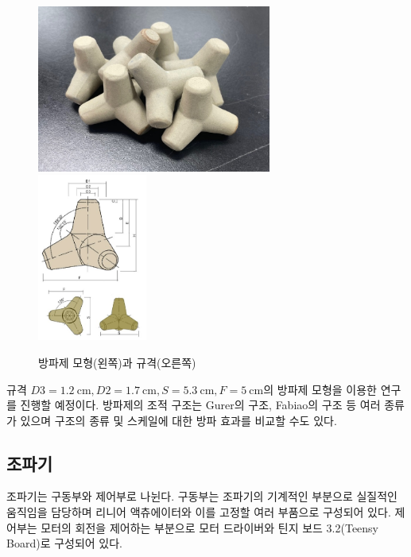 \begin{figure}[htbp]
    \centering
    \includegraphics[height=5.5cm]{images/Breakwater.jpg}
    \includegraphics[height=5.5cm]{images/Breakwater(Illustrated).jpg}
    \caption{방파제 모형(왼쪽)과 규격(오른쪽)}
    \label{Braekwater}
\end{figure}

규격 $D3=1.2\mathrm{~cm}, D2=1.7\mathrm{~cm}, S=5.3\mathrm{~cm}, F=5\mathrm{~cm}$의 방파제 모형을 이용한 연구를 진행할 예정이다. 방파제의 조적 구조는 Gurer의 구조, Fabiao의 구조 등 여러 종류가 있으며 구조의 종류 및 스케일에 대한 방파 효과를 비교할 수도 있다\cite{article}.




\subsection{조파기}


조파기는 구동부와 제어부로 나뉜다. 구동부는 조파기의 기계적인 부분으로 실질적인 움직임을 담당하며 리니어 액츄에이터와 이를 고정할 여러 부품으로 구성되어 있다. 제어부는 모터의 회전을 제어하는 부분으로 모터 드라이버와 틴지 보드 3.2(Teensy Board)로 구성되어 있다.

